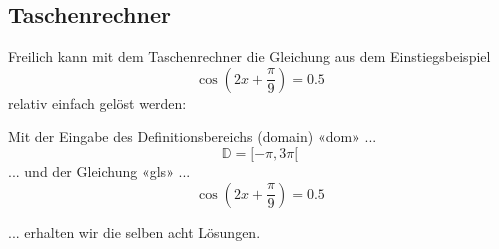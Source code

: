 \subsection{Taschenrechner}
Freilich kann mit dem Taschenrechner die Gleichung aus dem
Einstiegsbeispiel $$\cos(2x+\frac{\pi}{9})=0.5$$ relativ einfach gelöst werden:

Mit der Eingabe des Definitionsbereichs (domain) «dom» ...
$$\mathbb{D} =  [ -\pi, 3\pi[$$
... und der Gleichung «gls» ...
$$\cos\left(2x+\frac{\pi}{9}\right) = 0.5$$

... erhalten wir die selben acht Lösungen.
    

\newpage
